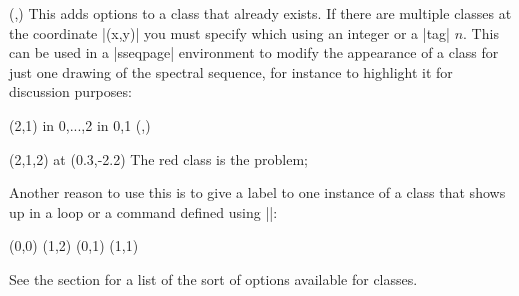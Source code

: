 \documentclass{ltxdoc}
\begin{document}
\begin{sseqdata}[name=ex1,degree={#1}{1-#1}]
\begin{command}{(,)}
This adds options to a class that already exists. If there are multiple classes at the coordinate |(x,y)| you must specify which using an integer or a |tag| $n$. This can be used in a |sseqpage| environment to modify the appearance of a class for just one drawing of the spectral sequence, for instance to highlight it for discussion purposes:
\begin{codeexample}[width=5cm]
\begin{sseqdata}[name=class options example,classes=fill]
\class(2,1)
\foreach \x in {0,...,2} \foreach \y in {0,1}{
    \class(\x,\y)
}
\end{sseqdata}
\begin{sseqpage}[name=class options example,right clip padding=0.6cm]
\classoptions[red](2,1,2) %
\node[background,text width=10em] at (0.3,-2.2)
    {\textup{The red class is the problem}};
\end{sseqpage}
\end{codeexample}
Another reason to use this is to give a label to one instance of a class that shows up in a loop or a command defined using |\sseqnewgroup|:
\begin{codeexample}[width=6cm]
\sseqnewgroup{}
\begin{sseqpage}[classes=fill,class labels={left=0.3em},math nodes]
\mygroup(0,0)
\mygroup(1,2)
\classoptions["2"](0,1)
\classoptions["\eta"](1,1)
\end{sseqpage}
\end{codeexample}
See the  section for a list of the sort of options available for classes.
\end{command}


\end{sseqdata}
\end{document}
